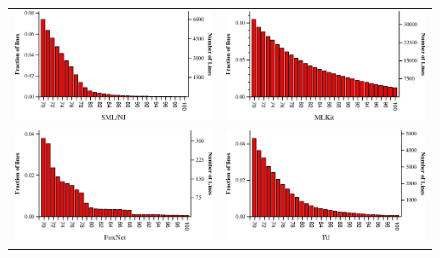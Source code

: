 \documentclass[12pt,abstracton]{scrartcl}
\begin{document}
\begin{figure}[h!]
\centering
\begin{tabular}{cc}
\includegraphics[scale=0.68]{smlnj.eps} & \includegraphics[scale=0.68]{mlkit.eps} \\
\includegraphics[scale=0.68]{foxnet.eps} & \includegraphics[scale=0.68]{til.eps} \\

\end{tabular}
\end{figure}
\end{document}
